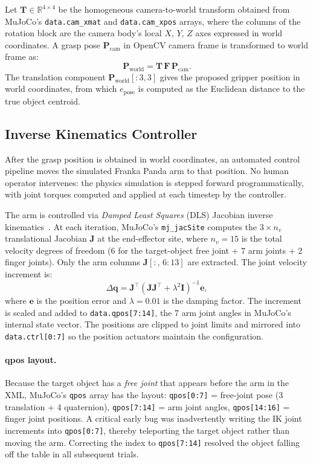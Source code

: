 \documentclass[journal]{IEEEtran}
\begin{document}
Let $\mathbf{T} \in \mathbb{R}^{4\times4}$ be the homogeneous
camera-to-world transform obtained from MuJoCo's
\texttt{data.cam\_xmat} and \texttt{data.cam\_xpos} arrays, where
the columns of the rotation block are the camera body's local $X$,
$Y$, $Z$ axes expressed in world coordinates.  A grasp pose
$\mathbf{P}_{\text{cam}}$ in OpenCV camera frame is transformed to
world frame as:
\begin{equation}
  \mathbf{P}_{\text{world}} = \mathbf{T}\,\mathbf{F}\,\mathbf{P}_{\text{cam}}.
  \label{eq:transform}
\end{equation}
The translation component $\mathbf{P}_{\text{world}}[:3,3]$ gives
the proposed gripper position in world coordinates, from which
$e_{\text{pose}}$ is computed as the Euclidean distance to the true
object centroid.

\subsection{Inverse Kinematics Controller}
\label{sec:ik}

After the grasp position is obtained in world coordinates, an
automated control pipeline moves the simulated Franka Panda arm to
that position.  No human operator intervenes: the physics
simulation is stepped forward programmatically, with joint torques
computed and applied at each timestep by the controller.

The arm is controlled via \emph{Damped Least Squares} (DLS)
Jacobian inverse kinematics~\cite{nakamura1986inverse}.  At each
iteration, MuJoCo's \texttt{mj\_jacSite} computes the $3\times
n_v$ translational Jacobian $\mathbf{J}$ at the end-effector site,
where $n_v = 15$ is the total velocity degrees of freedom (6 for the
target-object free joint + 7 arm joints + 2 finger joints).  Only
the arm columns $\mathbf{J}[:,\,6{:}13]$ are extracted.  The joint
velocity increment is:
\begin{equation}
  \Delta\mathbf{q} = \mathbf{J}^{\top}
    \left(\mathbf{J}\mathbf{J}^{\top} + \lambda^2\mathbf{I}\right)^{-1}
    \mathbf{e},
  \label{eq:dls}
\end{equation}
where $\mathbf{e}$ is the position error and $\lambda = 0.01$ is
the damping factor.  The increment is scaled and added to
\texttt{data.qpos[7:14]}, the 7 arm joint angles in MuJoCo's
internal state vector.  The positions are clipped to joint limits
and mirrored into \texttt{data.ctrl[0:7]} so the position actuators
maintain the configuration.

\paragraph{qpos layout.}
Because the target object has a \emph{free joint} that appears
before the arm in the XML, MuJoCo's \texttt{qpos} array has the
layout: \texttt{qpos[0:7]} = free-joint pose (3 translation + 4
quaternion), \texttt{qpos[7:14]} = arm joint angles,
\texttt{qpos[14:16]} = finger joint positions.  A critical early
bug was inadvertently writing the IK joint increments into
\texttt{qpos[0:7]}, thereby teleporting the target object rather
than moving the arm.  Correcting the index to \texttt{qpos[7:14]}
resolved the object falling off the table in all subsequent trials.
\end{document}
